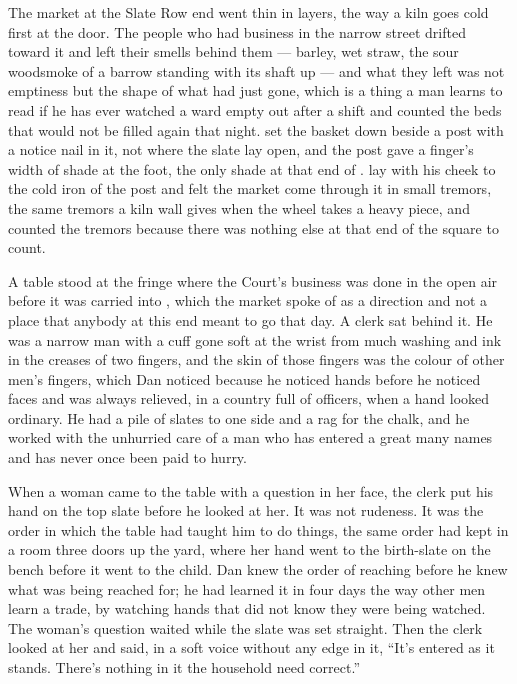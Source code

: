 The market at the Slate Row end went thin in layers, the way a kiln goes cold first at the door. The people who had business in the narrow street drifted toward it and left their smells behind them — barley, wet straw, the sour woodsmoke of a barrow standing with its shaft up — and what they left was not emptiness but the shape of what had just gone, which is a thing a man learns to read if he has ever watched a ward empty out after a shift and counted the beds that would not be filled again that night.  set the basket down beside a post with a notice nail in it, not where the slate lay open, and the post gave a finger's width of shade at the foot, the only shade at that end of .  lay with his cheek to the cold iron of the post and felt the market come through it in small tremors, the same tremors a kiln wall gives when the wheel takes a heavy piece, and counted the tremors because there was nothing else at that end of the square to count.

A table stood at the fringe where the Court's business was done in the open air before it was carried into , which the market spoke of as a direction and not a place that anybody at this end meant to go that day. A clerk sat behind it. He was a narrow man with a cuff gone soft at the wrist from much washing and ink in the creases of two fingers, and the skin of those fingers was the colour of other men's fingers, which Dan noticed because he noticed hands before he noticed faces and was always relieved, in a country full of officers, when a hand looked ordinary. He had a pile of slates to one side and a rag for the chalk, and he worked with the unhurried care of a man who has entered a great many names and has never once been paid to hurry.

When a woman came to the table with a question in her face, the clerk put his hand on the top slate before he looked at her. It was not rudeness. It was the order in which the table had taught him to do things, the same order  had kept in a room three doors up the yard, where her hand went to the birth-slate on the bench before it went to the child. Dan knew the order of reaching before he knew what was being reached for; he had learned it in four days the way other men learn a trade, by watching hands that did not know they were being watched. The woman's question waited while the slate was set straight. Then the clerk looked at her and said, in a soft voice without any edge in it, “It's entered as it stands. There's nothing in it the household need correct.”

